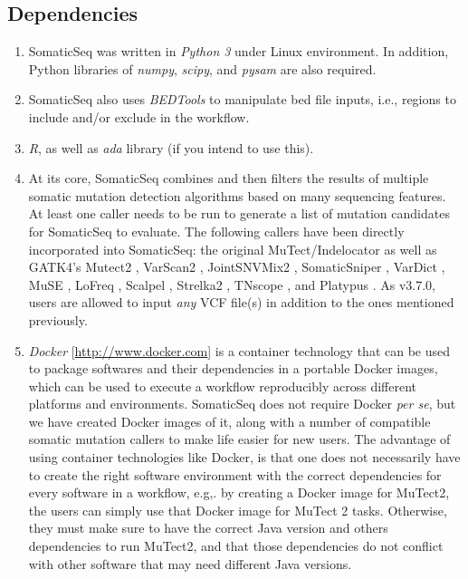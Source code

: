 \documentclass[10pt,letterpaper]{article}
\begin{document}
\begin{sloppypar}
\subsection{Dependencies}

\begin{enumerate}

    \item
    SomaticSeq was written in \emph{Python 3} under Linux environment. In addition, Python libraries of \emph{numpy}, \emph{scipy}, and \emph{pysam} are also required. 

    \item
    SomaticSeq also uses \emph{BEDTools} \cite{bedtools} to manipulate bed file inputs, i.e., regions to include and/or exclude in the workflow. 

    \item
    \emph{R}, as well as \emph{ada} library (if you intend to use this).

    \item
    At its core, SomaticSeq combines and then filters the results of multiple somatic mutation detection algorithms based on many sequencing features. At least one caller needs to be run to generate a list of mutation candidates for SomaticSeq to evaluate. The following callers have been directly incorporated into SomaticSeq: the original MuTect/Indelocator as well as GATK4's Mutect2 \cite{mutect}, VarScan2 \cite{varscan2}, JointSNVMix2 \cite{jointsnvmix2}, SomaticSniper \cite{somaticsniper}, VarDict \cite{vardict}, MuSE \cite{muse}, LoFreq \cite{lofreq}, Scalpel \cite{scalpel}, Strelka2 \cite{strelka2}, TNscope \cite{tnscope}, and Platypus \cite{platypus}. As v3.7.0, users are allowed to input \emph{any} VCF file(s) in addition to the ones mentioned previously. 
    
    \item
    \emph{Docker} [\href{http://www.docker.com}{http://www.docker.com}] is a container technology that can be used to package softwares and their dependencies in a portable Docker images, which can be used to execute a workflow reproducibly across different platforms and environments. SomaticSeq does not require Docker \textit{per se}, but we have created Docker images of it, along with a number of compatible somatic mutation callers to make life easier for new users. The advantage of using container technologies like Docker, is that one does not necessarily have to create the right software environment with the correct dependencies for every software in a workflow, e.g,. by creating a Docker image for MuTect2, the users can simply use that Docker image for MuTect 2 tasks. Otherwise, they must make sure to have the correct Java version and others dependencies to run MuTect2, and that those dependencies do not conflict with other software that may need different Java versions. 


\end{enumerate}
\end{sloppypar}
\end{document}
